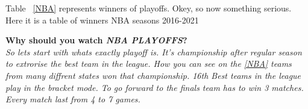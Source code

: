 \begin{flushleft}


\centering

\newpage

{Table ~\ref{NBA} represents winners of playoffs.}
\newline
Okey, so now something serious. Here it is a table of winners NBA seasons 2016-2021
\newline





\begin{center}
    \large \textbf {Why should you watch \emph{NBA PLAYOFFS}?}\\
\textit{So lets start with whats exactly playoff is. It's championship after regular season to extrorise the best team in the league. How you can see on the \ref{NBA}  teams from many diffrent states won that championship.
16th Best teams in the league play in the bracket mode. To go forward to the finals team has to win 3 matches. Every match last from 4 to 7 games.}
\end{center}
\end{flushleft}
